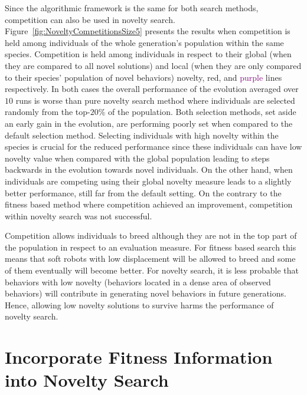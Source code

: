 Since the algorithmic framework is the same for both search methods, competition can also be used in novelty search. Figure~\ref{fig:NoveltyCompetitionsSize5} presents the results when competition is held among individuals of the whole generation's population within the same species. Competition is held among individuals in respect to their global (when they are compared to all novel solutions) and local (when they are only compared to their species' population of novel behaviors) novelty, \textcolor{BrickRed}{red}, and \textcolor{Purple}{purple} lines respectively. In both cases the overall performance of the evolution averaged over $10$ runs is worse than pure novelty search method where individuals are selected randomly from the top-$20\%$ of the population. Both selection methods, set aside an early gain in the evolution, are performing poorly set when compared to the default selection method. Selecting individuals with high novelty within the species is crucial for the reduced performance since these individuals can have low novelty value when compared with the global population leading to steps backwards in the evolution towards novel individuals. On the other hand, when individuals are competing using their global novelty measure leads to a slightly better performance, still far from the default setting. On the contrary to the fitness based method where competition achieved an improvement, competition within novelty search was not successful. 

Competition allows individuals to breed although they are not in the top part of the population in respect to an evaluation measure. For fitness based search this means that soft robots with low displacement will be allowed to breed and some of them eventually will become better. For novelty search, it is less probable that behaviors with low novelty (behaviors located in a dense area of observed behaviors) will contribute in generating novel behaviors in future generations. Hence, allowing low novelty solutions to survive harms the performance of novelty search.


\section{Incorporate Fitness Information into Novelty Search}

